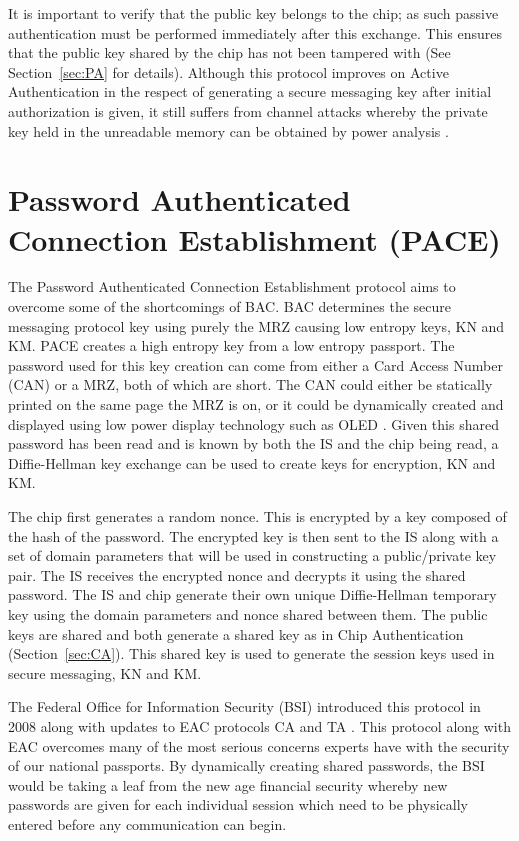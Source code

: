 \documentclass[12pt]{article}
\begin{document}
It is important to verify that the public key belongs to the chip; as such passive authentication must be performed immediately after this exchange. This ensures that the public key shared by the chip has not been tampered with (See Section~\ref{sec:PA} for details). 
Although this protocol improves on Active Authentication in the respect of generating a secure messaging key after initial authorization is given, it still suffers from channel attacks whereby the private key held in the unreadable memory can be obtained by power analysis \cite{Blundo:2008uf}.


\section{Password Authenticated Connection Establishment (PACE)}
\label{sec:PACE}
The Password Authenticated Connection Establishment protocol aims to overcome some of the shortcomings of BAC. BAC determines the secure messaging protocol key using purely the MRZ causing low entropy keys, KN and KM. PACE creates a high entropy key from a low entropy passport. The password used for this key creation can come from either a Card Access Number (CAN) or a MRZ, both of which are short. The CAN could either be statically printed on the same page the MRZ is on, or it could be dynamically created and displayed using low power display technology such as OLED \cite{Nithyanand:2009ud}. Given this shared password has been read and is known by both the IS and the chip being read, a Diffie-Hellman key exchange can be used to create keys for encryption, KN and KM.

The chip first generates a random nonce. This is encrypted by a key composed of the hash of the password. The encrypted key is then sent to the IS along with a set of domain parameters that will be used in constructing a public/private key pair. The IS receives the encrypted nonce and decrypts it using the shared password. The IS and chip generate their own unique Diffie-Hellman temporary key using the domain parameters and nonce shared between them. The public keys are shared and both generate a shared key as in Chip Authentication (Section~\ref{sec:CA}). This shared key is used to generate the session keys used in secure messaging, KN and KM.

The Federal Office for Information Security (BSI) introduced this protocol in 2008 along with updates to EAC protocols CA and TA \cite{Nithyanand:2009ud}. This protocol along with EAC overcomes many of the most serious concerns experts have with the security of our national passports. By dynamically creating shared passwords, the BSI would be taking a leaf from the new age financial security whereby new passwords are given for each individual session which need to be physically entered before any communication can begin.
\end{document}
